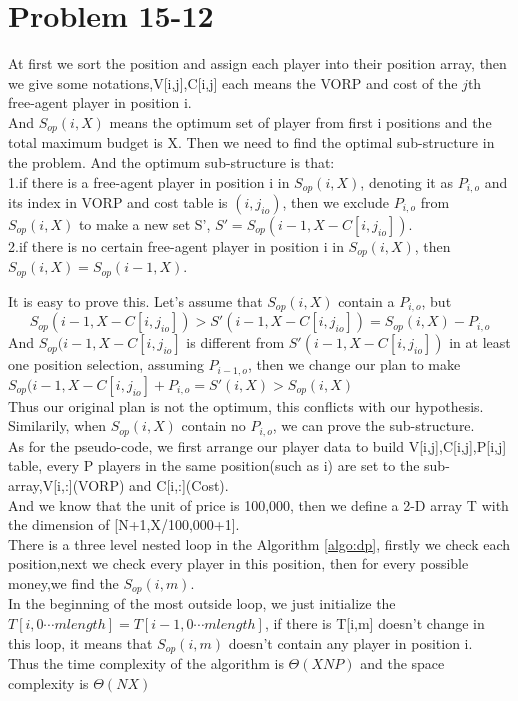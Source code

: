 \documentclass[oneside]{homework} %
\begin{document}
\maketitle
\newpage
\section {Problem 15-12}
At first we sort the position and assign each player into their position array, then we give some notations,V[i,j],C[i,j] each means the VORP and cost of the $j$th free-agent player in position i.\\
And $S_{op}(i,X)$ means the optimum set of player from first i positions and the total maximum budget is X.
Then we need to find the optimal sub-structure in the problem. And the optimum sub-structure is that:\\
1.if there is a free-agent player in position i in $S_{op}(i,X)$, denoting it as $P_{i,o}$ and its index in VORP and cost table is $(i,j_{io})$, then we exclude $P_{i,o}$ from 
$S_{op}(i,X)$ to make a new set S', $S' = S_{op}(i-1,X-C[i,j_{io}])$.
\\2.if there is no certain free-agent player in position i in $S_{op}(i,X)$, then $S_{op}(i,X) = S_{op}(i-1,X)$.

It is easy to prove this.
Let's assume that $S_{op}(i,X)$ contain a $P_{i,o}$, but 
$$S_{op}(i-1,X-C[i,j_{io}]) > S'(i-1,X-C[i,j_{io}]) = S_{op}(i,X)-P_{i,o}$$
And $ S_{op}(i-1,X-C[i,j_{io}] $ is different from $S'(i-1,X-C[i,j_{io}])$ in at least one position selection, assuming $P_{i-1,o}$, then we change our plan to make $S_{op}(i-1,X-C[i,j_{io}] + P_{i,o} = S'(i,X) > S_{op}(i,X)$ \\ 
Thus our original plan is not the optimum, this conflicts with our hypothesis.
Similarily, when $S_{op}(i,X)$ contain no $P_{i,o}$, we can prove the sub-structure.
\\[4px]
As for the pseudo-code, we first arrange our player data to build V[i,j],C[i,j],P[i,j] table, every P players in the same position(such as i) are set to the sub-array,V[i,:](VORP) and C[i,:](Cost). \\And we know that the unit of price is 100,000, then we define a 2-D array T with the dimension of [N+1,X/100,000+1].\\ 
There is a three level nested loop in the Algorithm \ref{algo:dp}, firstly we check each position,next we check every player in this position, then for every possible money,we find the $S_{op}(i,m)$.\\ 
In the beginning of the most outside loop, we just initialize the $T[i,0 \cdots mlength] = T[i-1,0 \cdots mlength]$, if there is T[i,m] doesn't change in this loop, it means that $S_{op}(i,m)$ doesn't contain any player in position i.\\
Thus the time complexity of the algorithm is $\Theta(XNP)$ and the space complexity is $\Theta(NX)$
\end{document}
